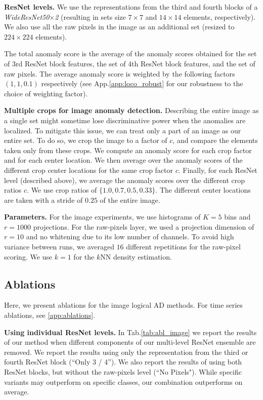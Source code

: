 \documentclass{article}
\begin{document}
\textbf{ResNet levels.} We use the representations from the third and fourth blocks of a \textit{WideResNet50$\times$2} (resulting in sets size $7\times7$ and $14\times14$ elements, respectively). We also use all the raw pixels in the image as an additional set (resized to $224\times224$ elements). 

The total anomaly score is the average of the anomaly scores obtained for the set of 3rd ResNet block features, the set of 4th ResNet block features, and the set of raw pixels. The average anomaly score is weighted by the following factors $(1,1,0.1)$ respectively (see App.\ref{app:loco_robust} for our robustness to the choice of weighting factor).



\textbf{Multiple crops for image anomaly detection.} Describing the entire image as a single set might sometime lose discriminative power when the anomalies are localized. To mitigate this issue, we can treat only a part of an image as our entire set. To do so, we crop the image to a factor of $c$, and compare the elements taken only from these crops. We compute an anomaly score for each crop factor and for each center location. We then average over the anomaly scores of the different crop center locations for the same crop factor $c$. Finally, for each ResNet level (described above), we average the anomaly scores over the different crop ratios $c$. We use crop ratios of $\{1.0,0.7,0.5,0.33\}$. The different center locations are taken with a stride of $0.25$ of the entire image.






\textbf{Parameters.} For the image experiments, we use histograms of $K=5$ bins and $r=1000$ projections. For the raw-pixels layer, we used a projection dimension of $r=10$ and no whitening due to its low number of channels. To avoid high variance between runs, we averaged $16$ different repetitions for the raw-pixel scoring. We use $k=1$ for the $k$NN density estimation.

\subsection{Ablations} 
\label{sec:ablation}

Here, we present ablations for the image logical AD methods. For time series ablations, see \cref{app:ablations}.

\textbf{Using individual ResNet levels.}
In Tab.\ref{tab:abl_image} we report the results of our method when different components of our multi-level ResNet ensemble are removed. We report the results using only the representation from the third or fourth ResNet block (``Only 3 / 4''). We also report the results of using both ResNet blocks, but without the raw-pixels level (``No Pixels"). 
While specific variants may outperform on specific classes, our combination outperforms on average. 
\end{document}
